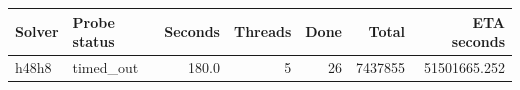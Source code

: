 {\small
\begin{tabular}{llrrrrr}
\hline
Solver & Probe status & Seconds & Threads & Done & Total & ETA seconds \\
\hline
h48h8 & timed\_out & 180.0 & 5 & 26 & 7437855 & 51501665.252 \\
\hline
\end{tabular}
}
